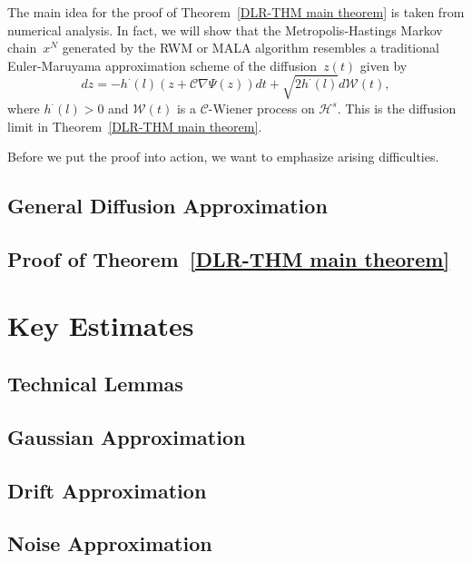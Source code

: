 The main idea for the proof of Theorem~\ref{DLR-THM main theorem} is taken from numerical analysis. In fact, we will show that the Metropolis-Hastings Markov chain~$x^N$ generated by the RWM or MALA algorithm resembles a traditional Euler-Maruyama approximation scheme of the diffusion~$z(t)$ given by
 \begin{equation}
 \label{DLR- diffusion process}
  dz = -h^{\cdot}(l) (z + \mathcal{C} \nabla \Psi(z)) dt + \sqrt{2 h^{\cdot}(l)} d\mathcal{W}(t),
 \end{equation}
where $h^{\cdot}(l) > 0$ and $\mathcal{W}(t)$ is a $\mathcal{C}$-Wiener process on $\mathcal{H}^s$. This is the diffusion limit in Theorem~\ref{DLR-THM main theorem}. 

Before we put the proof into action, we want to emphasize arising difficulties.

\subsection{General Diffusion Approximation}
\label{sec:sub:DLR-General diffusion approximation}

\subsection{Proof of Theorem~\ref{DLR-THM main theorem}}
\label{sec:sub:DLR-Proof}

\section{Key Estimates}
\label{sec:DLR-Estimates}

\subsection{Technical Lemmas}

\subsection{Gaussian Approximation}

\subsection{Drift Approximation}

\subsection{Noise Approximation}
 
